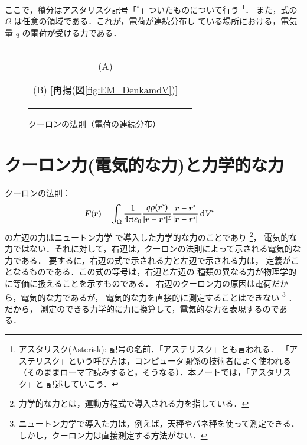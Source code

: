     ここで，積分はアスタリスク記号「$^{*}$」ついたものについて行う
        \footnote{
            アスタリスク(Asterisk): 記号の名前．「アステリスク」とも言われる．
            「アステリスク」という呼び方は，コンピュータ関係の技術者によく使われる
            （そのままローマ字読みすると，そうなる）．本ノートでは，「アスタリスク」と
            記述していこう．
        }．
    また，式の $\Omega$ は任意の領域である．これが，電荷が連続分布し
    ている場所における，電気量 $q$ の電荷が受ける力である．
        \begin{figure}[hbt]
            \begin{tabular}{cc}
                \begin{minipage}{0.5\hsize}
                    \begin{center}
                        {EM_CoulombRho.pdf}

                        (A)
                    \end{center}
                \end{minipage}
                \begin{minipage}{0.5\hsize}
                    \begin{center}
                        {EM_DenkamdV.pdf}

                        (B) [再揚(図\ref{fig:EM_DenkamdV})]
                    \end{center}
                \end{minipage}
            \end{tabular}
            \caption{クーロンの法則（電荷の連続分布）}
            \label{fig:EM_CoulombRho}
        \end{figure}


\section{クーロン力(電気的な力)と力学的な力}
    クーロンの法則：
        \begin{align*}
            \boldsymbol{F}(\boldsymbol{r})
            &=\int_\Omega \frac{1}{4\pi\varepsilon_{0}}
            \frac{q\rho(\boldsymbol{r}^{*})}{|\boldsymbol{r}-\boldsymbol{r}^{*}|^{2}}
            \frac{\boldsymbol{r}-\boldsymbol{r}^{*}}
                 {|\boldsymbol{r}-\boldsymbol{r}^{*}|}\,\mathrm{d} V^{*}
        \end{align*}
    の左辺の力はニュートン力学
    で導入した力学的な力のことであり
        \footnote{
            力学的な力とは，運動方程式で導入される力を指している．
        }，
    電気的な力ではない．それに対して，右辺は，クーロンの法則によって示される電気的な力である．
    要するに，右辺の式で示される力と左辺で示される力は，
    定義がことなるものである．この式の等号は，右辺と左辺の
    種類の異なる力が物理学的に等価に扱えることを示すものである．
    右辺のクーロン力の原因は電荷だから，電気的な力であるが，
    電気的な力を直接的に測定することはできない
        \footnote{
            ニュートン力学で導入た力は，例えば，天秤やバネ秤を使って測定できる．
            しかし，クーロン力は直接測定する方法がない．
        }
    ．だから，
    測定のできる力学的に力に換算して，電気的な力を表現するのであ
    る．

